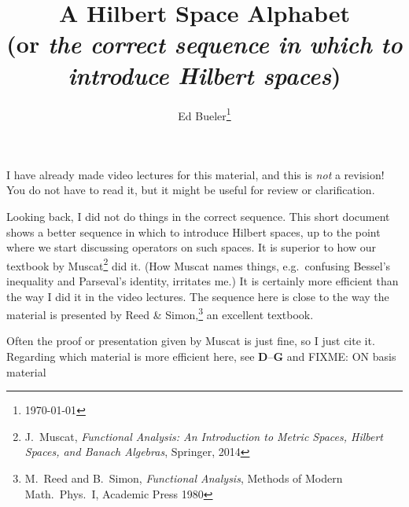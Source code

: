 \documentclass[11pt]{article}
\title{A Hilbert Space Alphabet \\ (or \emph{the correct sequence in which to introduce Hilbert spaces})}
\author{Ed Bueler\footnote{\today}}
\date{}
\begin{document}
\maketitle

I have already made video lectures for this material, and this is \emph{not} a revision!  You do not have to read it, but it might be useful for review or clarification.

Looking back, I did not do things in the correct sequence.  This short document shows a better sequence in which to introduce Hilbert spaces, up to the point where we start discussing operators on such spaces.  It is superior to how our textbook by Muscat\footnote{J.~Muscat, \emph{Functional Analysis: An Introduction to Metric Spaces, Hilbert Spaces, and Banach Algebras}, Springer, 2014} did it.  (How Muscat names things, e.g.~confusing Bessel's inequality and Parseval's identity, irritates me.)  It is certainly more efficient than the way I did it in the video lectures.  The sequence here is close to the way the material is presented by Reed \& Simon,\footnote{M.~Reed and B.~Simon, \emph{Functional Analysis}, Methods of Modern Math.~Phys.~I, Academic Press 1980} an excellent textbook.

Often the proof or presentation given by Muscat is just fine, so I just cite it.  Regarding which material is more efficient here, see \textbf{D}--\textbf{G} and FIXME: ON basis material

\vspace{0.25in}
\end{document}
